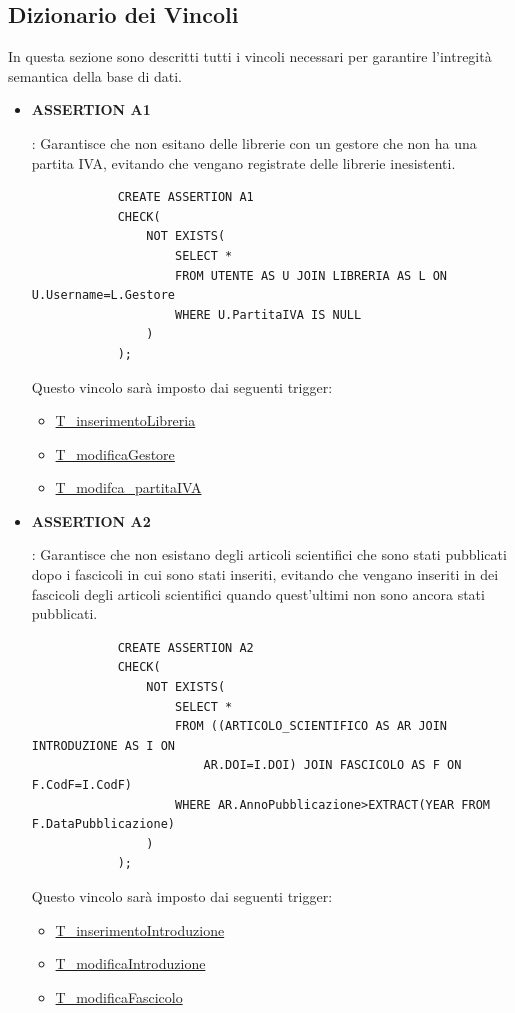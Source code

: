 \documentclass{article}
\begin{document}
\subsection{Dizionario dei Vincoli}
In questa sezione sono descritti tutti i vincoli necessari per garantire l'intregità semantica della base di dati.

\begin{itemize} 
    \item \hypertarget{assertion1}{\textbf{ASSERTION A1}}: Garantisce che non esitano delle librerie con un gestore che non ha una partita IVA, evitando che vengano registrate delle librerie inesistenti.
        \begin{verbatim}
            CREATE ASSERTION A1
            CHECK(
                NOT EXISTS(
                    SELECT *
                    FROM UTENTE AS U JOIN LIBRERIA AS L ON U.Username=L.Gestore
                    WHERE U.PartitaIVA IS NULL
                )
            );
        \end{verbatim}
    Questo vincolo sarà imposto dai seguenti trigger:
        \begin{itemize}
            \item \hyperlink{t1}{T\_inserimentoLibreria}
            \item \hyperlink{t2}{T\_modificaGestore}
            \item \hyperlink{t3}{T\_modifca\_partitaIVA}
        \end{itemize}

    \item \hypertarget{assertion2}{\textbf{ASSERTION A2}}: Garantisce che non esistano degli articoli scientifici che sono stati pubblicati dopo i fascicoli in cui sono stati inseriti, evitando che vengano inseriti in dei fascicoli degli articoli scientifici quando quest'ultimi non sono ancora stati pubblicati.
        \begin{verbatim}
            CREATE ASSERTION A2
            CHECK(
                NOT EXISTS(
                    SELECT *
                    FROM ((ARTICOLO_SCIENTIFICO AS AR JOIN INTRODUZIONE AS I ON
                        AR.DOI=I.DOI) JOIN FASCICOLO AS F ON F.CodF=I.CodF) 
                    WHERE AR.AnnoPubblicazione>EXTRACT(YEAR FROM F.DataPubblicazione)  
                )
            );
        \end{verbatim}
    Questo vincolo sarà imposto dai seguenti trigger:
        \begin{itemize}
            \item \hyperlink{t4}{T\_inserimentoIntroduzione}
            \item \hyperlink{t5}{T\_modificaIntroduzione}
            \item \hyperlink{t6}{T\_modificaFascicolo}
        \end{itemize}


\end{itemize}
\end{document}
